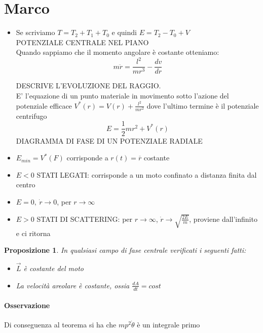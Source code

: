 \documentclass[a4paper,12pt]{article}
\begin{document}
\section{Marco}	
\begin{itemize}


\item Se scriviamo $T=T_2+T_1+T_0$ e quindi $E=T_2-T_0+V$ \\
POTENZIALE CENTRALE NEL PIANO \\
Quando sappiamo che il momento angolare è costante otteniamo:
\begin{displaymath}
m\ddot{r}=\frac{l^2}{mr^3}-\frac{dv}{dr}
\end{displaymath}

DESCRIVE L'EVOLUZIONE DEL RAGGIO.\\
E' l'equazione di un punto materiale in movimento sotto l'azione del potenziale efficace $V^*(r)=V(r)+\frac{l^2}{mr^2}$ dove l'ultimo termine è il potenziale centrifugo
\begin{displaymath}
E=\frac{1}{2}mr^2 + V^*(r)
\end{displaymath}
DIAGRAMMA DI FASE DI UN POTENZIALE RADIALE
\item $E_{min}=V^*(F)$ corrisponde a $r(t)=\overline{r}$ costante
\item $E<0$ STATI LEGATI: corrisponde a un moto confinato a distanza finita dal centro
\item $E=0,\ \dot{r}\to0$, per $r\to\infty$
\item $E>0$ STATI DI SCATTERING: per $r\to\infty$, $\dot{r}\to\sqrt{\frac{2E}{m}}$, proviene dall'infinito e ci ritorna
\end{itemize}
\newtheorem{prop}{Proposizione}[section]

\begin{prop}
In qualsiasi campo di fase centrale verificati i seguenti fatti:
\begin{itemize} 
\item $\vec{L}$ è costante del moto
\item La velocità areolare è costante, ossia $\frac{dA}{dt}=cost$

\end{itemize}
 

\end{prop}
\paragraph{Osservazione} Di conseguenza al teorema si ha che $mp^2\dot{\theta}$ è un integrale primo
\end{document}
